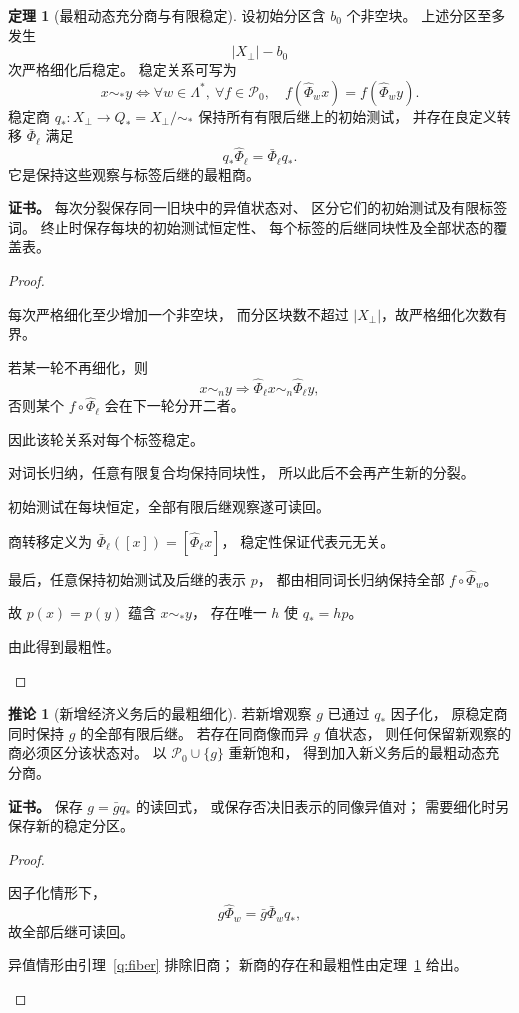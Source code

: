 \documentclass[UTF8,12pt,a4paper,openany,fontset=none,zihao=false]{ctexrep}
\theoremstyle{definition}
\newtheorem{theorem}{定理}[chapter]
\newtheorem{corollary}{推论}[chapter]
\newenvironment{certificate}{\par\noindent\textbf{证书。}\ignorespaces}{\par}
\newcommand{\1}{\mathbf 1}
\begin{document}
\begin{theorem}[最粗动态充分商与有限稳定]
\label{q:dynamic}
设初始分区含 \(b_0\) 个非空块。
上述分区至多发生
\[
|X_\bot|-b_0
\]
次严格细化后稳定。
稳定关系可写为
\[
x\sim_*y
\Longleftrightarrow
\forall w\in\Lambda^*,\ \forall f\in\mathcal P_0,\quad
f(\widehat\Phi_wx)=f(\widehat\Phi_wy).
\]
稳定商 \(q_*:X_\bot\to Q_*=X_\bot/{\sim_*}\)
保持所有有限后继上的初始测试，
并存在良定义转移 \(\bar\Phi_\ell\) 满足
\[
q_*\widehat\Phi_\ell=\bar\Phi_\ell q_*.
\]
它是保持这些观察与标签后继的最粗商。
\end{theorem}
\begin{certificate}
每次分裂保存同一旧块中的异值状态对、
区分它们的初始测试及有限标签词。
终止时保存每块的初始测试恒定性、
每个标签的后继同块性及全部状态的覆盖表。
\end{certificate}
\begin{proof}
\begin{semanticsteps}
\item 每次严格细化至少增加一个非空块，
而分区块数不超过 \(|X_\bot|\)，故严格细化次数有界。
\item 若某一轮不再细化，则
\[
x\sim_ny\Longrightarrow
\widehat\Phi_\ell x\sim_n\widehat\Phi_\ell y,
\]
否则某个 \(f\circ\widehat\Phi_\ell\) 会在下一轮分开二者。
\item 因此该轮关系对每个标签稳定。
\item 对词长归纳，任意有限复合均保持同块性，
所以此后不会再产生新的分裂。
\item 初始测试在每块恒定，全部有限后继观察遂可读回。
\item 商转移定义为
\(\bar\Phi_\ell([x])=[\widehat\Phi_\ell x]\)，
稳定性保证代表元无关。
\item 最后，任意保持初始测试及后继的表示 \(p\)，
都由相同词长归纳保持全部
\(f\circ\widehat\Phi_w\)。
\item 故 \(p(x)=p(y)\) 蕴含 \(x\sim_*y\)，
存在唯一 \(h\) 使 \(q_*=hp\)。
\item 由此得到最粗性。
\end{semanticsteps}
\end{proof}
\begin{corollary}[新增经济义务后的最粗细化]
\label{q:new-observation}
若新增观察 \(g\) 已通过 \(q_*\) 因子化，
原稳定商同时保持 \(g\) 的全部有限后继。
若存在同商像而异 \(g\) 值状态，
则任何保留新观察的商必须区分该状态对。
以 \(\mathcal P_0\cup\{g\}\) 重新饱和，
得到加入新义务后的最粗动态充分商。
\end{corollary}
\begin{certificate}
保存 \(g=\bar gq_*\) 的读回式，
或保存否决旧表示的同像异值对；
需要细化时另保存新的稳定分区。
\end{certificate}
\begin{proof}
\begin{semanticsteps}
\item 因子化情形下，
\[
g\widehat\Phi_w=\bar g\bar\Phi_wq_*,
\]
故全部后继可读回。
\item 异值情形由引理~\ref{q:fiber} 排除旧商；
新商的存在和最粗性由定理~\ref{q:dynamic} 给出。
\end{semanticsteps}
\end{proof}
\end{document}
